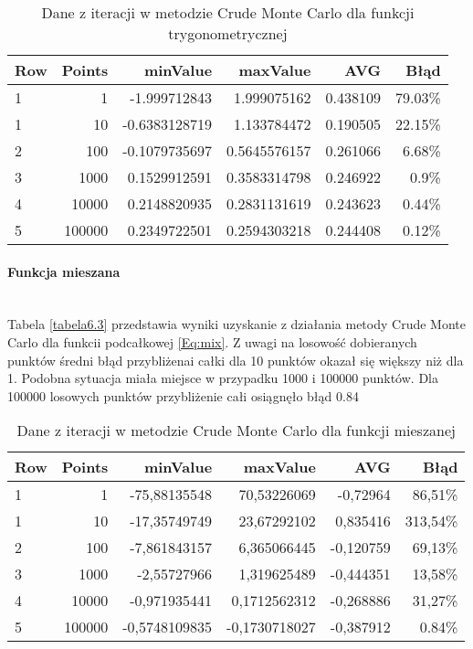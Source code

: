 \documentclass[12pt,twoside]{article}
\begin{document}
\begin{table}[H]
\centering 
\caption{Dane z iteracji w metodzie Crude Monte Carlo dla funkcji trygonometrycznej}
\label{tabela6.2}
\begin{tabular}{lrrrrr}
\toprule
{Row} &  Points &  minValue &  maxValue &       AVG &      Błąd \\
\midrule
1  &     1 & -1.999712843 &   1.999075162 & 0.438109 & 79.03\% \\
1  &     10 & -0.6383128719 &  1.133784472 & 0.190505 & 22.15\% \\
2  &     100 & -0.1079735697 &  0.5645576157 & 0.261066 & 6.68\% \\
3  &     1000 & 0.1529912591 &   0.3583314798 & 0.246922 & 0.9\% \\
4  &     10000 & 0.2148820935 &  0.2831131619 & 0.243623 & 0.44\% \\
5  &     100000 & 0.2349722501 &  0.2594303218 & 0.244408 & 0.12\% \\
\bottomrule
\end{tabular}
\end{table}

\paragraph{Funkcja mieszana}\mbox{} \\

Tabela \eqref{tabela6.3} przedstawia wyniki uzyskanie z działania metody Crude Monte Carlo dla funkcii podcałkowej \eqref{Eq:mix}.
Z uwagi na losowość dobieranych punktów średni błąd przybliżenai całki dla 10 punktów okazał się większy niż dla 1. Podobna sytuacja miała miejsce w przypadku 1000 i 100000 punktów. Dla 100000 losowych punktów przybliżenie całi osiągnęło błąd 0.84%

\begin{table}[H]
\centering 
\caption{Dane z iteracji w metodzie Crude Monte Carlo dla funkcji mieszanej}
\label{tabela6.3}
\begin{tabular}{lrrrrr}
\toprule
{Row} &  Points &  minValue &  maxValue &       AVG &      Błąd \\
\midrule
1  &     1 & -75,88135548 &   70,53226069 & -0,72964 & 86,51\% \\
1  &     10 & -17,35749749 &  23,67292102 & 0,835416 & 313,54\% \\
2  &     100 & -7,861843157 &  6,365066445 & -0,120759 & 69,13\% \\
3  &     1000 & -2,55727966 &   1,319625489 & -0,444351 & 13,58\% \\
4  &     10000 & -0,971935441 &  0,1712562312 & -0,268886 & 31,27\% \\
5  &     100000 & -0,5748109835 &  -0,1730718027 & -0,387912 & 0.84\% \\
\bottomrule
\end{tabular}
\end{table}
\end{document}
